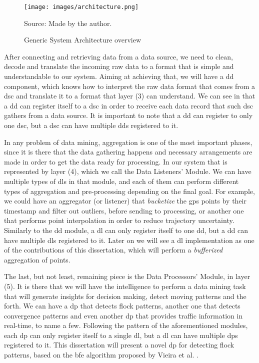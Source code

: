 \begin{figure}[h!]
    \centering
    \caption{Generic System Architecture overview}
    \centerline{\texttt{[image: images/architecture.png]}}
    \footnotesize{Source: Made by the author.}
    \label{fig:architecture}
\end{figure}

After connecting and retrieving data from a data source, we need to clean, decode and translate the incoming raw data to
a format that is simple and understandable to our system. Aiming at achieving that, we will have a \ac{dd} component,
which knows how to interpret the raw data format that comes from a \ac{dsc} and translate it to a format that layer (3)
can understand. We can see in  that a \ac{dd} can register itself to a \ac{dsc} in order to
receive each data record that such \ac{dsc} gathers from a data source. It is important to note that a \ac{dd} can
register to only one \ac{dsc}, but a \ac{dsc} can have multiple \acp{dd} registered to it.

In any problem of data mining, aggregation is one of the most important phases, since it is there that the data
gathering happens and necessary arrangements are made in order to get the data ready for processing. In our system that
is represented by layer (4), which we call the Data Listeners' Module. We can have multiple types of \acp{dl} in that
module, and each of them can perform different types of aggregation and pre-processing depending on the final goal.  For
example, we could have an aggregator (or listener) that \textit{bucketize} the \ac{gps} points by their timestamp and
filter out outliers, before sending to processing, or another one that performs point interpolation in order to reduce
trajectory uncertainty. Similarly to the \ac{dd} module, a \ac{dl} can only register itself to one \ac{dd}, but a
\ac{dd} can have multiple \acp{dl} registered to it. Later on we will see a \ac{dl} implementation as one of the
contributions of this dissertation, which will perform a \textit{bufferized} aggregation of points.

The last, but not least, remaining piece is the Data Processors' Module, in layer (5). It is there that we will have the
intelligence to perform a data mining task that will generate insights for decision making, detect moving patterns and
the forth. We can have a \ac{dp} that detects flock patterns, another one that detects convergence patterns and even
another \ac{dp} that provides traffic information in real-time, to name a few. Following the pattern of the
aforementioned modules, each \ac{dp} can only register itself to a single \ac{dl}, but a \ac{dl} can have multiple
\acp{dp} registered to it. This dissertation will present a novel \ac{dp} for detecting flock patterns, based on the
\ac{bfe} algorithm proposed by Vieira et al. \citep{vieira}.

